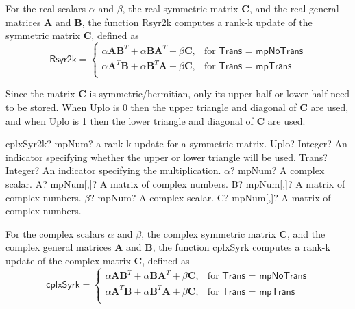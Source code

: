 \vspace{0.3cm}
For the real scalars $\alpha$ and $\beta$, the real symmetric matrix $\boldsymbol{C}$, and the real general matrices $\boldsymbol{A}$ and $\boldsymbol{B}$, the function \textsf{Rsyr2k} computes a rank-k update of the symmetric matrix $\boldsymbol{C}$, defined as 
\begin{equation}
\textsf{Rsyr2k}=\begin{cases}
\alpha \boldsymbol{A} \boldsymbol{B}^T+ \alpha \boldsymbol{B} \boldsymbol{A}^T + \beta \boldsymbol{C}, & \text{for } \textsf{Trans = mpNoTrans} \\
\alpha \boldsymbol{A}^T \boldsymbol{B} + \alpha \boldsymbol{B}^T \boldsymbol{A} + \beta \boldsymbol{C}, & \text{for } \textsf{Trans = mpTrans} \\
\end{cases}
\end{equation}

Since the matrix $\boldsymbol{C}$ is symmetric/hermitian, only its upper half or lower half need to be stored. When \textsf{Uplo} is 0 then the upper triangle and diagonal of $\boldsymbol{C}$ are used, and when \textsf{Uplo} is 1 then the lower triangle and diagonal of $\boldsymbol{C}$ are used. 


\vspace{0.6cm}
\begin{mpFunctionsExtract}
	\mpFunctionSeven
	{cplxSyr2k? mpNum? a rank-k update for a symmetric matrix.}
	{Uplo? Integer? An indicator specifying whether the upper or lower triangle will be used.}
	{Trans? Integer? An indicator specifying the multiplication.}
	{$\alpha$? mpNum? A complex scalar.}
	{A? mpNum[,]? A matrix of complex numbers.}
	{B? mpNum[,]? A matrix of complex numbers.}
	{$\beta$? mpNum? A complex scalar.}
	{C? mpNum[,]? A matrix of complex numbers.}
\end{mpFunctionsExtract}

\vspace{0.3cm}
For the complex scalars $\alpha$ and $\beta$, the complex symmetric matrix $\boldsymbol{C}$, and the complex general matrices $\boldsymbol{A}$ and $\boldsymbol{B}$, the function \textsf{cplxSyrk} computes a rank-k update of the complex matrix $\boldsymbol{C}$, defined as 
\begin{equation}
\textsf{cplxSyrk}=\begin{cases}
\alpha \boldsymbol{A} \boldsymbol{B}^T+ \alpha \boldsymbol{B} \boldsymbol{A}^T + \beta \boldsymbol{C}, & \text{for } \textsf{Trans = mpNoTrans} \\
\alpha \boldsymbol{A}^T \boldsymbol{B} + \alpha \boldsymbol{B}^T \boldsymbol{A} + \beta \boldsymbol{C}, & \text{for } \textsf{Trans = mpTrans} \\
\end{cases}
\end{equation}

